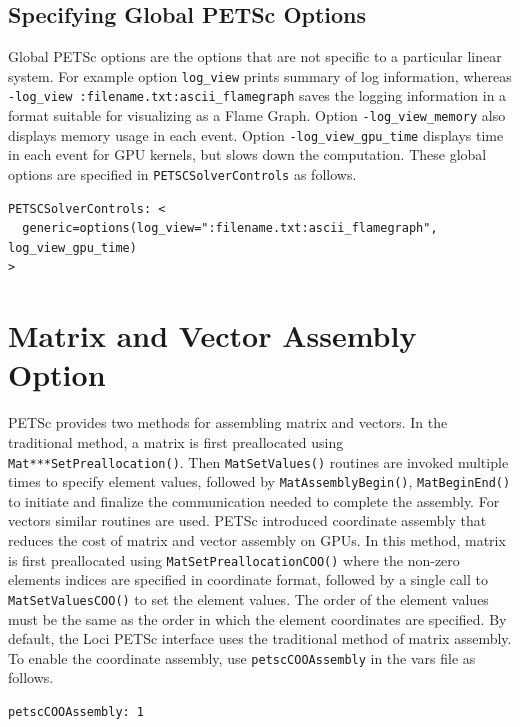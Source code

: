 \documentclass{article}
\begin{document}
\subsection{Specifying Global PETSc Options}
Global PETSc options are the options that are not specific to a
particular linear system. For example option \texttt{log\_view} prints
summary of log information, whereas \texttt{-log\_view
  :filename.txt:ascii\_flamegraph} saves the logging information in a
format suitable for visualizing as a Flame Graph. Option
\texttt{-log\_view\_memory} also displays memory usage in each
event. Option \texttt{-log\_view\_gpu\_time} displays time in each
event for GPU kernels, but slows down the computation.  These global
options are specified in \texttt{PETSCSolverControls} as follows.
\begin{verbatim}
PETSCSolverControls: <
  generic=options(log_view=":filename.txt:ascii_flamegraph", log_view_gpu_time)
>
\end{verbatim}

\section{Matrix and Vector Assembly Option}
PETSc provides two methods for assembling matrix and vectors.  In the
traditional method, a matrix is first preallocated using
\texttt{Mat***SetPreallocation()}. Then \texttt{MatSetValues()}
routines are invoked multiple times to specify element values,
followed by \texttt{MatAssemblyBegin()}, \texttt{MatBeginEnd()} to
initiate and finalize the communication needed to complete the
assembly. For vectors similar routines are used. PETSc introduced
coordinate assembly that reduces the cost of matrix and vector
assembly on GPUs. In this method, matrix is first preallocated using
\texttt{MatSetPreallocationCOO()} where the non-zero elements indices
are specified in coordinate format, followed by a single call to
\texttt{MatSetValuesCOO()} to set the element values. The order of the
element values must be the same as the order in which the element
coordinates are specified. By default, the Loci PETSc interface uses
the traditional method of matrix assembly. To enable the coordinate
assembly, use \texttt{petscCOOAssembly} in the vars file as follows.
\begin{verbatim}
petscCOOAssembly: 1
\end{verbatim}
\end{document}
